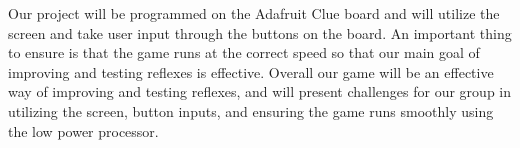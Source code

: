 \documentclass[12pt]{article}
\begin{document}
Our project will be programmed on the Adafruit Clue board and will utilize the screen and take user input through the buttons on the board. An important thing to ensure is that the game runs at the correct speed so that our main goal of improving and testing reflexes is effective. Overall our game will be an effective way of improving and testing reflexes, and will present challenges for our group in utilizing the screen, button inputs, and ensuring the game runs smoothly using the low power processor.


\newpage
\printbibliography
%
%
\end{document}
